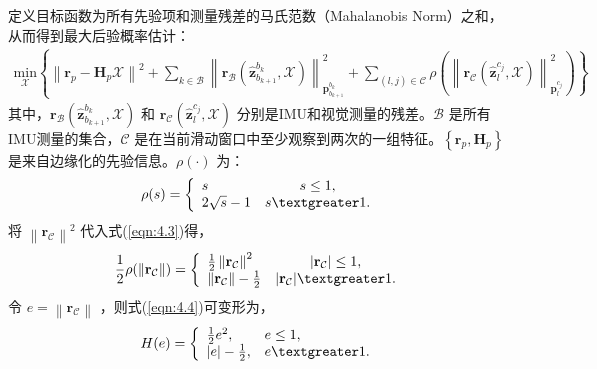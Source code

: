定义目标函数为所有先验项和测量残差的马氏范数（Mahalanobis Norm）之和，从而得到最大后验概率估计：
\begin{equation}
\label{eqn:4.2}
\begin{split}
\underset{\mathcal{X}}{\text{min}}
\left\{
\left\| 
\mathbf{r}_p-\mathbf{H}_p\mathcal{X} 
\right\|^2+
\sum_{k\in\mathcal{B}}
\left\| 
\mathbf{r}_\mathcal{B}(\hat{\mathbf{z}}_{b_{k+1}}^{b_k},\mathcal{X}) 
\right\|
_{\mathbf{p}_{b_{k+1}}^{b_k}}^2+ \right. 
\left.\sum_{(l,j)\in\mathcal{C}}\rho(
\left\| 
\mathbf{r}_\mathcal{C}(\hat{\mathbf{z}}_l^{c_j},\mathcal{X}) 
\right\|
_{\mathbf{p}_l^{c_j}}^2) 
\right\}
\end{split}
\end{equation}
其中，$\mathbf{r}_\mathcal{B}(\hat{\mathbf{z}}_{b_{k+1}}^{b_k},\mathcal{X})  $ 和 $\mathbf{r}_\mathcal{C}(\hat{\mathbf{z}}_l^{c_j},\mathcal{X})  $ 分别是IMU和视觉测量的残差。$\mathcal{B} $ 是所有IMU测量的集合，$\mathcal{C} $ 是在当前滑动窗口中至少观察到两次的一组特征。$\left\{ \mathbf{r}_p,\mathbf{H}_p\right\} $ 是来自边缘化的先验信息。$\rho (\cdot) $ 为：
\begin{equation}
\label{eqn:4.3}
\rho(s)=
\left\{\begin{array}{lc}
s & s\leq 1,\\
2\sqrt{s}-1 & s\textgreater 1.
\end{array}\right. 
\end{equation}
将 $\left\| \mathbf{r}_\mathcal{C} \right\|^2 $ 代入式(\ref{eqn:4.3})得，
\begin{equation}
\label{eqn:4.4}
\frac{1}{2}\rho( \left\| \mathbf{r}_\mathcal{C} \right\| )=\left\{\begin{array}{lc}
\frac{1}{2} \left\| \mathbf{r}_\mathcal{C} \right\|^2 & |\mathbf{r}_\mathcal{C}| \leq 1,\\
\left\| \mathbf{r}_\mathcal{C}\right\| - \frac{1}{2} & |\mathbf{r}_\mathcal{C}| \textgreater 1.
\end{array}\right. 
\end{equation}
令 $e=\left\| \mathbf{r}_\mathcal{C} \right\|  $ ，则式(\ref{eqn:4.4})可变形为，
\begin{equation}
\label{eqn:4.5}
\begin{split}
H(e)=\left \{
\begin{array}{ll}
\frac12 e^2, & e \leq 1,\\
|e| - \frac12, & e \textgreater 1.
\end{array}
\right.
\end{split}
\end{equation}
